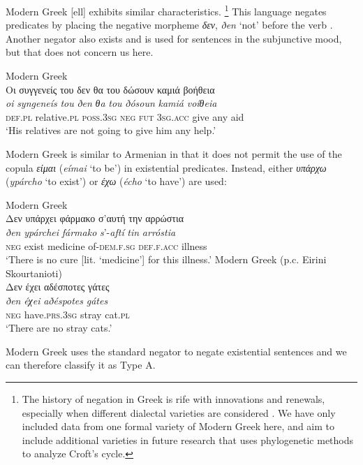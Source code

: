 \documentclass[output=paper]{langsci/langscibook}
\begin{document}
Modern Greek [ell] exhibits similar characteristics.%
%
\footnote{The history of negation in Greek is rife with innovations and
renewals, especially when different dialectal varieties are considered
\parencite[for example, see][]{KiparskyCondoravdi2006-ieur}. We have only included data from one formal variety of Modern Greek here, and aim to include additional varieties in future research that uses phylogenetic methods to analyze Croft's cycle.} 
%
This language negates predicates by placing the negative morpheme
\textit{δεν}, \textit{ðen} `not' before the verb
\parencite[510]{HoltonMackridge2012}. Another negator also exists and is
used for sentences in the subjunctive mood, but that does not concern us
here. 
%
\begin{exe}\ex
Modern Greek \parencite[510]{HoltonMackridge2012}\\
    \glll Οι συγγενείς του δεν θα του δώσουν καμιά βοήθεια \\
\textit{oi} \textit{syngeneís} \textit{tou} \textit{ðen} \textit{θa} \textit{tou} \textit{ðósoun} \textit{kamiá} \textit{voíθeia} \\
\textsc{def.pl} relative.\textsc{pl} \textsc{poss.3sg} \textsc{neg}
\textsc{fut} \textsc{3sg.acc} give any aid\\
    \glt `His relatives are not going to give him any help.' 
    \end{exe}
%
Modern Greek is similar to Armenian in that it does not permit the use of
the copula \textit{είμαι} (\textit{eímai} `to be') in existential
predicates. Instead, either \textit{υπάρχω} (\textit{ypárcho} `to exist')
or \textit{έχω} (\textit{écho} `to have') are used:
%
\begin{exe}\ex
Modern Greek \parencite[493]{HoltonMackridge2012}\\
    \glll Δεν υπάρχει φάρμακο σ'αυτή την αρρώστια \\
\textit{ðen} \textit{ypárchei} \textit{fármako} \textit{s}’-\textit{aftí} \textit{tin} \textit{arróstia} \\
\textsc{neg} exist medicine of-\textsc{dem.f.sg} \textsc{def.f.acc}
illness\\
    \glt
`There is no cure [lit. ‘medicine'] for this illness.' 
\ex
Modern Greek (p.c. Eirini Skourtanioti)\\
    \glll Δεν έχει αδέσποτες γάτες\\
\textit{ðen} \textit{éχei} \textit{aðéspotes} \textit{gátes} \\
\textsc{neg}  have.\textsc{prs.3sg} stray cat.\textsc{pl}\\
    \glt `There are no stray cats.'
    \end{exe}
%
Modern Greek uses the standard negator to negate existential sentences and we can therefore classify it as Type A. 
\end{document}
